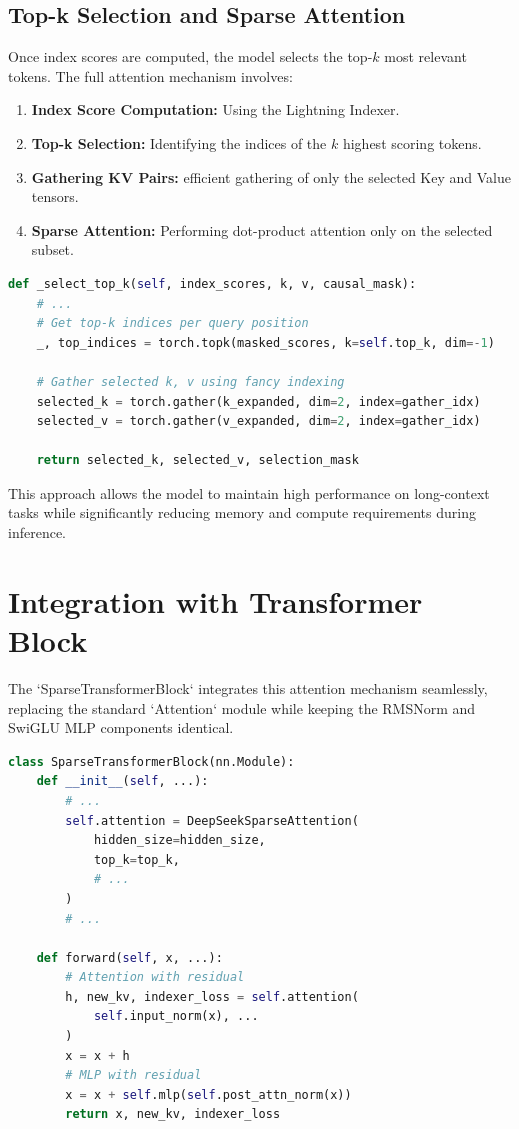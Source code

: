 \subsection{Top-k Selection and Sparse Attention}

Once index scores are computed, the model selects the top-$k$ most relevant tokens. The full attention mechanism involves:
\begin{enumerate}
    \item \textbf{Index Score Computation:} Using the Lightning Indexer.
    \item \textbf{Top-k Selection:} Identifying the indices of the $k$ highest scoring tokens.
    \item \textbf{Gathering KV Pairs:} efficient gathering of only the selected Key and Value tensors.
    \item \textbf{Sparse Attention:} Performing dot-product attention only on the selected subset.
\end{enumerate}

\begin{lstlisting}[language=Python, caption=Sparse Top-k Selection]
def _select_top_k(self, index_scores, k, v, causal_mask):
    # ...
    # Get top-k indices per query position
    _, top_indices = torch.topk(masked_scores, k=self.top_k, dim=-1)
    
    # Gather selected k, v using fancy indexing
    selected_k = torch.gather(k_expanded, dim=2, index=gather_idx)
    selected_v = torch.gather(v_expanded, dim=2, index=gather_idx)
    
    return selected_k, selected_v, selection_mask
\end{lstlisting}

This approach allows the model to maintain high performance on long-context tasks while significantly reducing memory and compute requirements during inference.

\section{Integration with Transformer Block}

The `SparseTransformerBlock` integrates this attention mechanism seamlessly, replacing the standard `Attention` module while keeping the RMSNorm and SwiGLU MLP components identical.

\begin{lstlisting}[language=Python, caption=Sparse Transformer Block]
class SparseTransformerBlock(nn.Module):
    def __init__(self, ...):
        # ...
        self.attention = DeepSeekSparseAttention(
            hidden_size=hidden_size,
            top_k=top_k,
            # ...
        )
        # ...

    def forward(self, x, ...):
        # Attention with residual
        h, new_kv, indexer_loss = self.attention(
            self.input_norm(x), ...
        )
        x = x + h
        # MLP with residual
        x = x + self.mlp(self.post_attn_norm(x))
        return x, new_kv, indexer_loss
\end{lstlisting}
